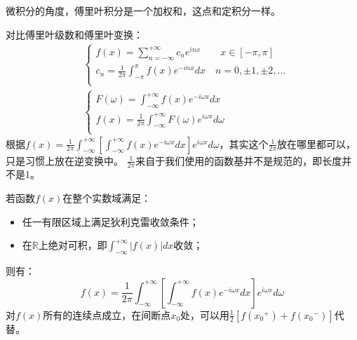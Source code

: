\begin{tcolorbox}
微积分的角度，傅里叶积分是一个加权和，这点和定积分一样。
\end{tcolorbox}

对比傅里叶级数和傅里叶变换：
\begin{align*}
&\begin{cases}
	f\left( x \right) =\sum_{n=-\infty}^{+\infty}{c_ne^{inx}} \qquad x\in \left[ -\pi ,\pi \right]\\
	c_n=\frac{1}{2\pi}\int_{-\pi}^{\pi}{f\left( x \right) e^{-inx}dx} \quad n=0,\pm 1,\pm 2,...\\
\end{cases} \\
&\begin{cases}
	F\left( \omega \right) =\int_{-\infty}^{+\infty}{f\left( x \right) e^{-i\omega x}dx}\\
	f\left( x \right) =\frac{1}{2\pi}\int_{-\infty}^{+\infty}{F\left( \omega \right) e^{i\omega x}d\omega}\\
\end{cases}
\end{align*}
根据$f\left( x \right) =\frac{1}{2\pi}\int_{-\infty}^{+\infty}{\left[ \int_{-\infty}^{+\infty}{f\left( x \right) e^{-i\omega x}dx} \right] e^{i\omega x}d\omega}$，其实这个$\frac{1}{2\pi}$放在哪里都可以，只是习惯上放在逆变换中。
$\frac{1}{2\pi}$来自于我们使用的函数基并不是规范的，即长度并不是1。

\begin{theorem}
若函数$f\left( x \right) $在整个实数域满足：
\begin{itemize}
    \item 任一有限区域上满足狄利克雷收敛条件；
    \item 在$\mathbb{R} $上绝对可积，即$\int_{-\infty}^{+\infty}{\left| f\left( x \right) \right|dx}$收敛；
\end{itemize}
则有：
\[
f\left( x \right) =\frac{1}{2\pi}\int_{-\infty}^{+\infty}{\left[ \int_{-\infty}^{+\infty}{f\left( x \right) e^{-i\omega x}dx} \right] e^{i\omega x}d\omega}
\]
对$f\left( x \right) $所有的连续点成立，在间断点$x_0$处，可以用$\frac{1}{2}\left[ f\left( {x_0}^+ \right) +f\left( {x_0}^- \right) \right] $代替。
\end{theorem}



